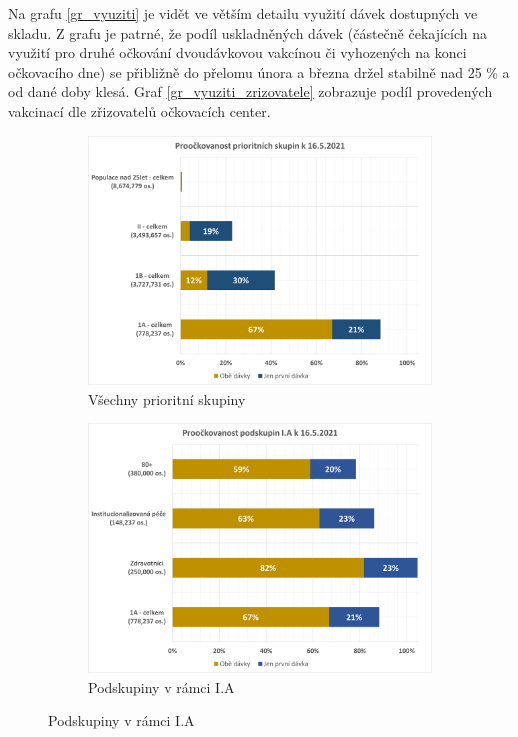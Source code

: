 Na grafu \ref{gr_vyuziti} je vidět ve větším detailu využití dávek dostupných ve skladu. Z grafu je patrné, že podíl uskladněných dávek (částečně čekajících na využití pro druhé očkování dvoudávkovou vakcínou či vyhozených na konci očkovacího dne) se přibližně do přelomu února a března držel stabilně nad 25 \% a od dané doby klesá.
%
Graf \ref{gr_vyuziti_zrizovatele} zobrazuje podíl provedených vakcinací dle zřizovatelů očkovacích center.





\begin{figure}
\centering

\begin{subfigure}{0.9\textwidth}
\includegraphics[height=0.3\textheight, width=\textwidth]{assets/proockovanost_vsechnyPS}
\caption{Všechny prioritní skupiny}
\label{proockovanost_ps_vsechny}
\end{subfigure}

\begin{subfigure}{0.9\textwidth}
\includegraphics[height=0.3\textheight, width=\textwidth]{assets/proockovanost_1A}
\caption{Podskupiny v rámci I.A}
\label{proockovanost_ps_1a}
\end{subfigure}


\end{figure}

